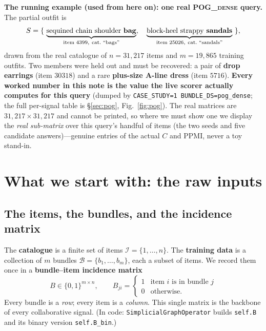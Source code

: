 \documentclass[11pt]{article}
\theoremstyle{remark}
\newcommand{\I}{\mathcal{I}}
\newcommand{\B}{\mathcal{B}}
\newcommand{\code}[1]{\texttt{\small #1}}
\begin{document}
\begin{keybox}
\textbf{The running example (used from here on): one real \textsc{POG\_dense} query.} The partial outfit is
\[
  S=\{\ \underbrace{\text{sequined chain shoulder \textbf{bag}}}_{\text{item }4399,\ \text{cat.\ ``bags''}},\quad
       \underbrace{\text{block-heel strappy \textbf{sandals}}}_{\text{item }25026,\ \text{cat.\ ``sandals''}}\ \},
\]
drawn from the real catalogue of $n=31{,}217$ items and $m=19{,}865$ training outfits. Two members were held out and
must be recovered: a pair of \textbf{drop earrings} (item $30318$) and a rare \textbf{plus-size A-line dress} (item
$5716$). \textbf{Every worked number in this note is the value the live scorer actually computes for this query}
(dumped by \code{CASE\_STUDY=1 BUNDLE\_DS=pog\_dense}; the full per-signal table is \S\ref{sec:pog},
Fig.~\ref{fig:pog}). The real matrices are $31{,}217\times31{,}217$ and cannot be printed, so where we must show one
we display the \emph{real sub-matrix} over this query's handful of items (the two seeds and five candidate
answers)---genuine entries of the actual $C$ and $\mathrm{PPMI}$, never a toy stand-in.
\end{keybox}

\section{What we start with: the raw inputs}
\label{sec:inputs}

\subsection{The items, the bundles, and the incidence matrix}

The \textbf{catalogue} is a finite set of items $\I=\{1,\dots,n\}$. The \textbf{training data} is a collection of
$m$ bundles $\B=\{b_1,\dots,b_m\}$, each a subset of items. We record them once in a \textbf{bundle--item incidence
matrix}
\[
  B\in\{0,1\}^{m\times n},\qquad B_{ji}=\begin{cases}1 & \text{item $i$ is in bundle $j$}\\ 0 &\text{otherwise.}\end{cases}
\]
Every bundle is a \emph{row}; every item is a \emph{column}. This single matrix is the backbone of every
collaborative signal. (In code: \code{SimplicialGraphOperator} builds \code{self.B} and its binary version
\code{self.B\_bin}.)
\end{document}
